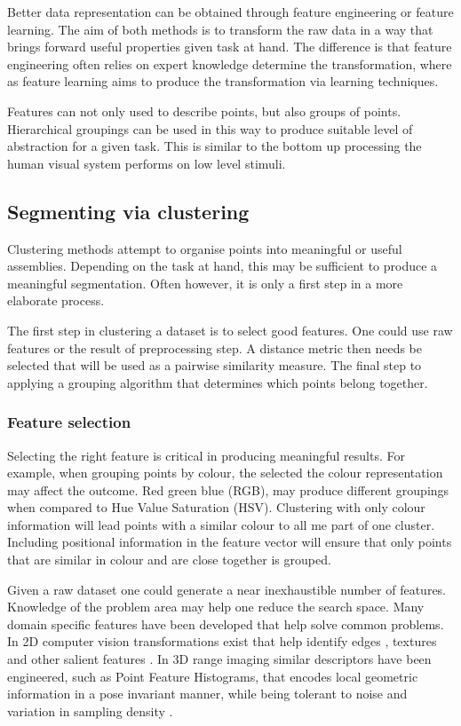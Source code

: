 Better data representation can be obtained through feature engineering or feature learning. The aim of both methods is to transform the raw data in a way that brings forward useful properties given task at hand. The difference is that feature engineering often relies on expert knowledge determine the transformation, where as feature learning aims to produce the transformation via learning techniques.

Features can not only used to describe points, but also groups of points. Hierarchical groupings can be used in this way to produce suitable level of abstraction for a given task. This is similar to the bottom up processing the human visual system performs on low level stimuli.


\subsection{Segmenting via clustering}

Clustering methods attempt to organise points into meaningful or useful assemblies. Depending on the task at hand, this may be sufficient to produce a meaningful segmentation. Often however, it is only a first step in a more elaborate process.

The first step in clustering a dataset is to select good features. One could use raw features or the result of preprocessing step. A distance metric then needs be selected that will be used as a pairwise similarity measure. The final step to applying a grouping algorithm that determines which points belong together.

\subsubsection*{Feature selection}

Selecting the right feature is critical in producing meaningful results. For example, when grouping points by colour, the selected the colour representation may affect the outcome. Red green blue (RGB), may produce different groupings when compared to Hue Value Saturation (HSV). Clustering with only colour information will lead points with a similar colour to all me part of one cluster. Including positional information in the feature vector will ensure that only points that are similar in colour and are close together is grouped.

Given a raw dataset one could generate a near inexhaustible number of features. Knowledge of the problem area may help one reduce the search space. Many domain specific features have been developed that help solve common problems. In 2D computer vision transformations exist that help identify edges \cite{Marcelja1980}, textures \cite{Hadjidemetriou} and other salient features \cite{Dalal}. In 3D range imaging similar descriptors have been engineered, such as Point Feature Histograms, that encodes local geometric information in a pose invariant manner, while being tolerant to noise and variation in sampling density \cite{Rusu}.  

